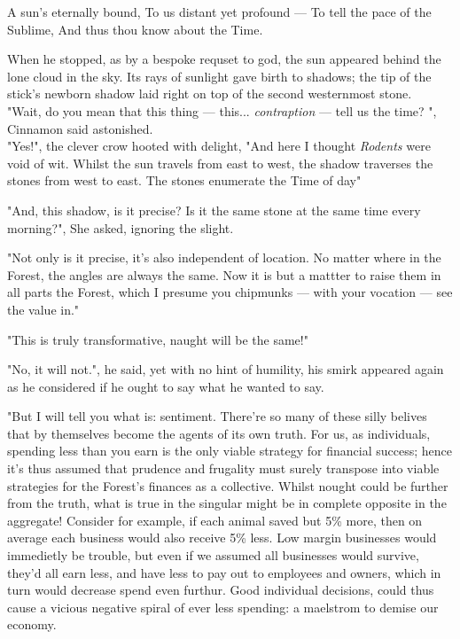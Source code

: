 	A sun's eternally bound,
	To us distant yet profound —
	To tell the pace of the Sublime,
	And thus thou know about the Time.



When he stopped, as by a bespoke requset to god, the sun appeared behind the lone cloud in the sky. Its rays of sunlight gave birth to shadows; the tip of the stick's newborn shadow laid right on top of the second westernmost stone.\\

"Wait, do you mean that this thing — this... \textit{contraption} — tell us the time? ", Cinnamon said astonished.\\

"Yes!", the clever crow hooted with delight, "And here I thought \textit{Rodents} were void of wit. Whilst the sun travels from east to west, the shadow traverses the stones from west to east. The stones enumerate the Time of day"

"And, this shadow, is it precise? Is it the same stone at the same time every morning?", She asked, ignoring the slight.

"Not only is it precise, it's also independent of location. No matter where in the Forest, the angles are always the same. Now it is but a mattter to raise them in all parts the Forest, which I presume you chipmunks — with your vocation — see the value in."

"This is truly transformative, naught will be the same!" 

"No, it will not.", he said, yet with no hint of humility, his smirk appeared again as he considered if he ought to say what he wanted to say.

"But I will tell you what is: sentiment. There're so many of these silly belives that by themselves become the agents of its own truth. For us, as individuals, spending less than you earn is the only viable strategy for financial success; hence it's thus assumed that prudence and frugality must surely transpose into viable strategies for the Forest's finances as a collective. Whilst nought could be further from the truth, what is true in the singular might be in complete opposite in the aggregate! Consider for example, if each animal saved but 5\% more, then on average each business would also receive 5\% less. Low margin businesses would immedietly be trouble, but even if we assumed all businesses would survive, they'd all earn less, and have less to pay out to employees and owners, which in turn would decrease spend even furthur. Good individual decisions, could thus cause a vicious negative spiral of ever less spending: a maelstrom to demise our economy. 
  
